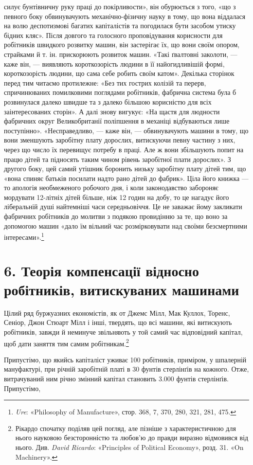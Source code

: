 \parcont{}  %
силує бунтівничну руку праці до покірливости», він обурюється
з того, «що з певного боку обвинувачують механічно-фізичну
науку в тому, що вона віддалася на волю деспотизмові багатих
капіталістів та погодилася бути засобом утиску бідних кляс».
Після довгого та голосного проповідування корисности для робітників
швидкого розвитку машин, він застерігає їх, що вони своїм
опором, страйками й т. ін. прискорюють розвиток машин. «Такі
ґвалтовні заколоти, — каже він, — виявляють короткозорість людини
в її найогидливішій формі, короткозорість людини, що сама
себе робить своїм катом». Декілька сторінок перед тим читаємо
протилежне: «Без тих гострих колізій та перерв, спричинюваних
помилковими поглядами робітників, фабрична система була б
розвинулася далеко швидше та з далеко більшою корисністю
для всіх заінтересованих сторін». А далі знову вигукує: «На
щастя для людности фабричних округ Великобританії поліпшення
в механіці відбуваються лише поступінно». «Несправедливо, —
каже він, — обвинувачують машини в тому, що вони зменшують
заробітну плату дорослих, витискуючи певну частину з них, через
що число їх перевищує потребу в праці. Але ж вони збільшують
попит на працю дітей та підносять таким чином рівень заробітної
плати дорослих». З другого боку, цей самий утішник боронить
низьку заробітну плату дітей тим, що «вона спиняє батьків посилати
надто рано дітей до фабрик». Ціла його книжка — то апологія
необмеженого робочого дня, і коли законодавство забороняє
мордувати 12-літніх дітей більше, ніж 12 годин на добу, то це
нагадує його ліберальній душі найтемніші часи середньовіччя.
Це не заважає йому закликати фабричних робітників до молитви
з подякою провидінню за те, що воно за допомогою машин
«дало їм вільний час розмірковувати над своїми безсмертними
інтересами».\footnote{
\emph{Ure}: «Philosophy of Manufacture», стор. 368, 7, 370, 280, 321, 281, 475.
}

\section*{6. Теорія компенсації відносно робітників, витискуваних
машинами}

Цілий ряд буржуазних економістів, як от Джемс Мілл, Мак
Куллох, Торенс, Сеніор, Джон Стюарт Мілл і інші, твердять,
що всі машини, які витискують робітників, завжди й неминуче
звільняють у той самий час відповідний капітал, щоб дати заняття
тим самим робітникам.\footnote{
Рікардо спочатку поділяв цей погляд, але пізніше з характеристичною
для нього науковою безсторонністю та любов’ю до правди виразно
відмовився від нього. Див. \emph{David Ricardo}: «Principles of Political
Economy», розд. 31. «On Machinery».
}

Припустімо, що якийсь капіталіст уживає 100 робітників,
приміром, у шпалерній мануфактурі, при річній заробітній платі
в 30 фунтів стерлінґів на кожного. Отже, витрачуваний ним річно
змінний капітал становить 3.000 фунтів стерлінґів. Припустімо,
\parbreak{}  %
